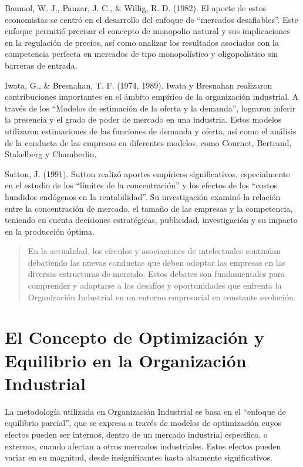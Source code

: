 \documentclass[
  doc,
  floatsintext,
  longtable,
  a4paper,
  nolmodern,
  notxfonts,
  notimes,
  12pt,
  colorlinks=true,linkcolor=blue,citecolor=blue,urlcolor=blue]{apa7}
\begin{document}
Baumol, W. J., Panzar, J. C., \& Willig, R. D. (1982). El aporte de
estos economistas se centró en el desarrollo del enfoque de ``mercados
desafiables''. Este enfoque permitió precisar el concepto de monopolio
natural y sus implicaciones en la regulación de precios, así como
analizar los resultados asociados con la competencia perfecta en
mercados de tipo monopolístico y oligopolístico sin barreras de entrada.

Iwata, G., \& Bresnahan, T. F. (1974, 1989). Iwata y Bresnahan
realizaron contribuciones importantes en el ámbito empírico de la
organización industrial. A través de los ``Modelos de estimación de la
oferta y la demanda'', lograron inferir la presencia y el grado de poder
de mercado en una industria. Estos modelos utilizaron estimaciones de
las funciones de demanda y oferta, así como el análisis de la conducta
de las empresas en diferentes modelos, como Cournot, Bertrand,
Stakelberg y Chamberlin.

Sutton, J. (1991). Sutton realizó aportes empíricos significativos,
especialmente en el estudio de los ``límites de la concentración'' y los
efectos de los ``costos hundidos endógenos en la rentabilidad''. Su
investigación examinó la relación entre la concentración de mercado, el
tamaño de las empresas y la competencia, teniendo en cuenta decisiones
estratégicas, publicidad, investigación y su impacto en la producción
óptima.

\begin{quote}
En la actualidad, los círculos y asociaciones de intelectuales continúan
debatiendo las nuevas conductas que deben adoptar las empresas en las
diversas estructuras de mercado. Estos debates son fundamentales para
comprender y adaptarse a los desafíos y oportunidades que enfrenta la
Organización Industrial en un entorno empresarial en constante
evolución.
\end{quote}

\section{El Concepto de Optimización y Equilibrio en la Organización
Industrial}\label{el-concepto-de-optimizaciuxf3n-y-equilibrio-en-la-organizaciuxf3n-industrial}

La metodología utilizada en Organización Industrial se basa en el
``enfoque de equilibrio parcial'', que se expresa a través de modelos de
optimización cuyos efectos pueden ser internos, dentro de un mercado
industrial específico, o externos, cuando afectan a otros mercados
industriales. Estos efectos pueden variar en su magnitud, desde
insignificantes hasta altamente significativos.
\end{document}
